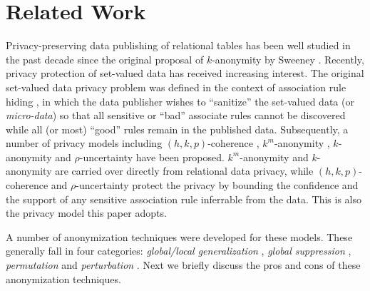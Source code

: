 \section{Related Work}
\label{sec:related}

Privacy-preserving data publishing of relational tables has been well
studied in the past decade since the original proposal of $k$-anonymity by
Sweeney \etal \cite{Sweeney2002:k-anonymity}.
%
Recently, privacy protection of set-valued data has received increasing
interest. The original set-valued data privacy problem was defined in the
context of association rule hiding 
\cite{atallah99:disclosure,tkde:VerykiosEBSD04:ARH,tkde:WuCC07:hiding}, 
in which the data publisher
wishes to ``sanitize'' the set-valued data (or {\em micro-data}) so that all
sensitive or ``bad'' associate rules cannot be discovered while all (or most)
``good'' rules remain in the published data.
Subsequently, a number of privacy models
including $(h,k,p)$-coherence \cite{Xu:2008:ATD},
$k^m$-anonymity \cite{Terrovitis:2008:PAS},
$k$-anonymity \cite{He:2009:ASD} and
$\rho$-uncertainty \cite{Cao:2010:rho} have been proposed.
$k^m$-anonymity and $k$-anonymity are carried over directly from
relational data privacy,
while $(h,k,p)$-coherence and $\rho$-uncertainty protect the
privacy by bounding the confidence and the support of
any sensitive association rule inferrable from the data. This is
also the privacy model this paper adopts.

A number of anonymization techniques
were developed for these models. 
These generally fall in four categories: {\em
global/local generalization} 
\cite{Terrovitis:2008:PAS,He:2009:ASD,Cao:2010:rho}, {\em global suppression} \cite{Xu:2008:ATD,Cao:2010:rho},
{\em permutation} \cite{2011:TKDE:Anonymous} and {\em perturbation}
\cite{Zhang:2007:agg,ChenMFDX11:Diff}. Next we briefly discuss the pros and
cons of these anonymization techniques.

